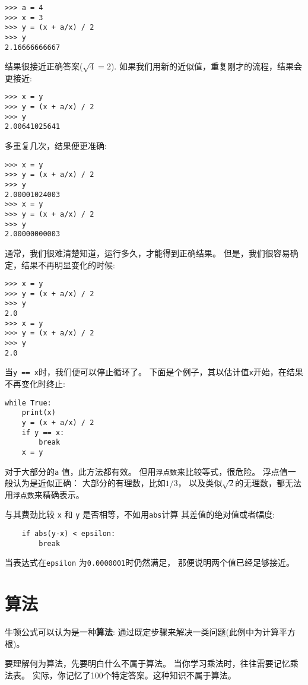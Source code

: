 \documentclass[10pt]{book}
\begin{document}
\begin{verbatim}
>>> a = 4
>>> x = 3
>>> y = (x + a/x) / 2
>>> y
2.16666666667
\end{verbatim}
%
结果很接近正确答案($\sqrt{4} = 2$).
 如果我们用新的近似值，重复刚才的流程，结果会更接近:

\begin{verbatim}
>>> x = y
>>> y = (x + a/x) / 2
>>> y
2.00641025641
\end{verbatim}
%
多重复几次，结果便更准确:

\begin{verbatim}
>>> x = y
>>> y = (x + a/x) / 2
>>> y
2.00001024003
>>> x = y
>>> y = (x + a/x) / 2
>>> y
2.00000000003
\end{verbatim}
%
通常，我们很难清楚知道，运行多久，才能得到正确结果。
但是，我们很容易确定，结果不再明显变化的时候:

\begin{verbatim}
>>> x = y
>>> y = (x + a/x) / 2
>>> y
2.0
>>> x = y
>>> y = (x + a/x) / 2
>>> y
2.0
\end{verbatim}
%
当{\tt y == x}时，我们便可以停止循环了。
下面是个例子，其以估计值{\tt x}开始，在结果不再变化时终止:

\begin{verbatim}
while True:
    print(x)
    y = (x + a/x) / 2
    if y == x:
        break
    x = y
\end{verbatim}
%
对于大部分的{\tt a} 值，此方法都有效。
但用{\tt 浮点数}来比较等式，很危险。
浮点值一般认为是近似正确：
大部分的有理数，比如$1/3$，
以及类似$\sqrt{2}$的无理数，都无法用{\tt 浮点数}来精确表示。

与其费劲比较 {\tt x} 和 {\tt y} 是否相等，不如用{\tt abs}计算
其差值的绝对值或者幅度:

\begin{verbatim}
    if abs(y-x) < epsilon:
        break
\end{verbatim}
%
当表达式在\verb"epsilon" 为{\tt 0.0000001}时仍然满足，
那便说明两个值已经足够接近。


\section{算法}
牛顿公式可以认为是一种{\bf 算法}:
通过既定步骤来解决一类问题(此例中为计算平方根)。

要理解何为算法，先要明白什么不属于算法。
当你学习乘法时，往往需要记忆乘法表。
实际，你记忆了100个特定答案。这种知识不属于算法。
\end{document}
